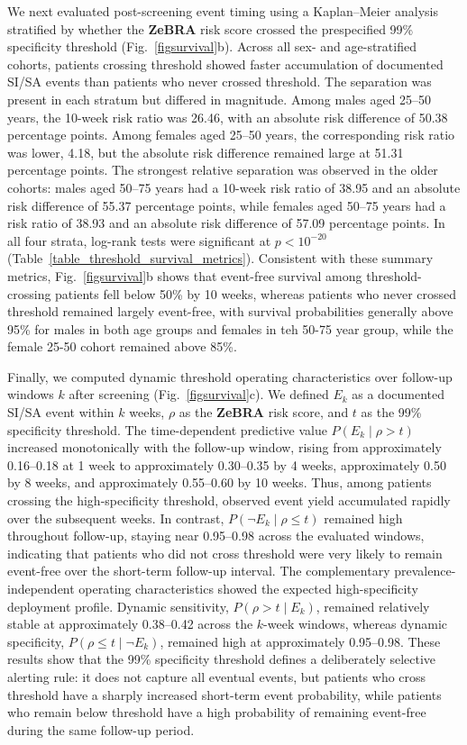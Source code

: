 \documentclass[onecolumn, compsoc,11pt]{IEEEtran}
\def\zebra{\textbf{ZeBRA}\xspace}
\def\zebra{\textbf{ZeBRA}\xspace}
\begin{document}
We next evaluated post-screening event timing using a Kaplan--Meier analysis stratified by whether the \zebra risk score crossed the prespecified 99\% specificity threshold (Fig.~\ref{figsurvival}b). Across all sex- and age-stratified cohorts, patients crossing threshold showed faster accumulation of documented SI/SA events than patients who never crossed threshold. The separation was present in each stratum but differed in magnitude. Among males aged 25--50 years, the 10-week risk ratio was 26.46, with an absolute risk difference of 50.38 percentage points. Among females aged 25--50 years, the corresponding risk ratio was lower, 4.18, but the absolute risk difference remained large at 51.31 percentage points. The strongest relative separation was observed in the older cohorts: males aged 50--75 years had a 10-week risk ratio of 38.95 and an absolute risk difference of 55.37 percentage points, while females aged 50--75 years had a risk ratio of 38.93 and an absolute risk difference of 57.09 percentage points. In all four strata, log-rank tests were significant at $p < 10^{-20}$ (Table~\ref{table_threshold_survival_metrics}). Consistent with these summary metrics, Fig.~\ref{figsurvival}b shows that event-free survival among threshold-crossing patients fell below 50\% by 10 weeks, whereas patients who never crossed threshold remained largely event-free, with survival probabilities generally above 95\% for males in both age groups and females in teh 50-75 year group, while the female 25-50 cohort remained above 85\%.


Finally, we computed dynamic threshold operating characteristics over follow-up windows \(k\) after screening (Fig.~\ref{figsurvival}c). We defined \(E_k\) as a documented SI/SA event within \(k\) weeks, \(\rho\) as the \zebra risk score, and \(t\) as the 99\% specificity threshold. The time-dependent predictive value \(P(E_k \mid \rho > t)\) increased monotonically with the follow-up window, rising from approximately 0.16--0.18 at 1 week to approximately 0.30--0.35 by 4 weeks, approximately 0.50 by 8 weeks, and approximately 0.55--0.60 by 10 weeks. Thus, among patients crossing the high-specificity threshold, observed event yield accumulated rapidly over the subsequent weeks. In contrast, \(P(\neg E_k \mid \rho \leq t)\) remained high throughout follow-up, staying near 0.95--0.98 across the evaluated windows, indicating that patients who did not cross threshold were very likely to remain event-free over the short-term follow-up interval.
The complementary prevalence-independent operating characteristics showed the expected high-specificity deployment profile. Dynamic sensitivity, \(P(\rho > t \mid E_k)\), remained relatively stable at approximately 0.38--0.42 across the \(k\)-week windows, whereas dynamic specificity, \(P(\rho \leq t \mid \neg E_k)\), remained high at approximately 0.95--0.98. These results show that the 99\% specificity threshold defines a deliberately selective alerting rule: it does not capture all eventual events, but patients who cross threshold have a sharply increased short-term event probability, while patients who remain below threshold have a high probability of remaining event-free during the same follow-up period.
\end{document}
